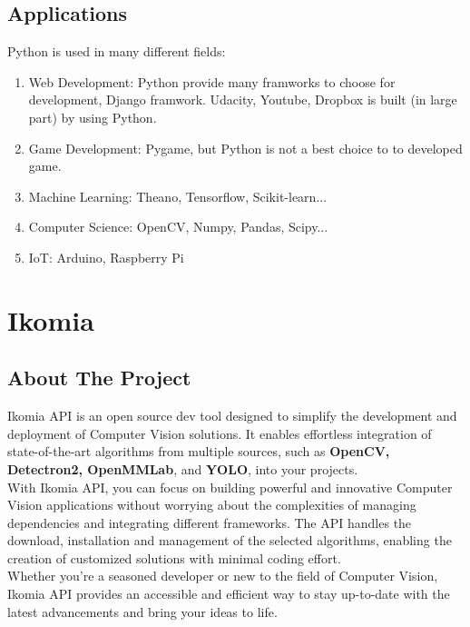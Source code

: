     \subsection{Applications}
        Python is used in many different fields: 
        \begin{enumerate}
            \item Web Development: Python provide many framworks to choose for development, Django framwork. Udacity, Youtube, Dropbox is built (in large part) by using Python.
            \item Game Development: Pygame, but Python is not a best choice to to developed game.
            \item Machine Learning: Theano, Tensorflow, Scikit-learn... 
            \item Computer Science: OpenCV, Numpy, Pandas, Scipy... 
            \item IoT: Arduino, Raspberry Pi 
        \end{enumerate}

\section{Ikomia}
    \subsection{About The Project}
        Ikomia API is an open source dev tool designed to simplify the development and deployment of Computer Vision solutions. It enables effortless integration of state-of-the-art algorithms from multiple sources, such as \textbf{OpenCV, Detectron2, OpenMMLab}, and \textbf{YOLO}, into your projects. \\
        \vspace{3mm}
        With Ikomia API, you can focus on building powerful and innovative Computer Vision applications without worrying about the complexities of managing dependencies and integrating different frameworks. The API handles the download, installation and management of the selected algorithms, enabling the creation of customized solutions with minimal coding effort. \\
        \vspace{3mm}
        Whether you’re a seasoned developer or new to the field of Computer Vision, Ikomia API provides an accessible and efficient way to stay up-to-date with the latest advancements and bring your ideas to life.
